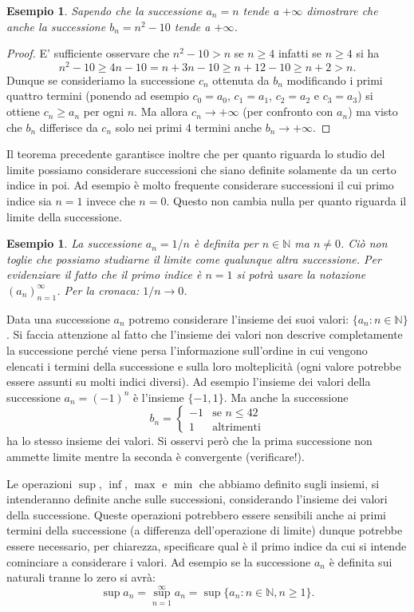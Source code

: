 \documentclass[italian,a4paper,oneside,headinclude]{scrbook}
\newcommand{\NN}{\mathbb N}
\newtheorem{example}[theorem]{Esempio}
\begin{document}
\begin{example}
Sapendo che la successione $a_n = n$ tende a $+\infty$ dimostrare
che anche la successione $b_n = n^2-10$ tende a $+\infty$.
\end{example}
%
\begin{proof}
E' sufficiente osservare che $n^2-10 > n$ se $n\ge 4$ infatti
se $n\ge 4$ si ha
\[
n^2 - 10 \ge 4 n -10 = n + 3n - 10 \ge n + 12 -10 \ge n+2 > n.
\]
Dunque se consideriamo la successione $c_n$ ottenuta da $b_n$
modificando i primi quattro termini (ponendo ad esempio $c_0 = a_0$,
$c_1=a_1$, $c_2=a_2$ e $c_3=a_3$) si ottiene $c_n\ge a_n$ per ogni $n$.
Ma allora $c_n \to +\infty$ (per confronto con $a_n$) ma visto che
$b_n$ differisce da $c_n$ solo nei primi 4 termini anche $b_n\to +\infty$.
\end{proof}

Il teorema precedente garantisce inoltre
che per quanto riguarda lo studio del limite possiamo considerare
successioni che siano definite solamente da un certo indice in poi.
Ad esempio è molto frequente considerare successioni il cui primo indice sia
$n=1$ invece che $n=0$. Questo non cambia nulla per quanto riguarda il limite
della successione.

\begin{example}
La successione $a_n = 1/n$ è definita per $n\in \NN$ ma $n\neq 0$.
Ciò non toglie che possiamo studiarne il limite come qualunque altra
successione. Per evidenziare il fatto che il primo indice è $n=1$
si potrà usare la notazione $(a_n)_{n=1}^\infty$.
Per la cronaca: $1/n \to 0$.
\end{example}

Data una successione $a_n$ potremo considerare l'insieme
dei suoi valori: $\{a_n\colon n\in \NN\}$.
Si faccia attenzione al fatto che l'insieme dei valori
non descrive completamente la successione perché
viene persa l'informazione sull'ordine in cui vengono elencati
i termini della successione e sulla loro molteplicità (ogni valore
potrebbe essere assunti su molti indici diversi). Ad esempio
l'insieme dei valori della successione $a_n = (-1)^n$ è l'insieme $\{-1, 1\}$. Ma anche la successione
\[
 b_n = \begin{cases}
   -1 & \text{se $n\le 42$}\\
   1  & \text{altrimenti}
 \end{cases}
\]
ha lo stesso insieme dei valori. Si osservi però
che la prima successione non ammette limite mentre la seconda
è convergente (verificare!).

Le operazioni $\sup$, $\inf$, $\max$ e $\min$ che abbiamo
definito sugli insiemi, si intenderanno definite anche
sulle successioni, considerando l'insieme dei valori della successione.
Queste operazioni potrebbero essere sensibili anche ai primi termini della
successione (a differenza dell'operazione di limite) dunque potrebbe
essere necessario, per chiarezza, specificare qual è il primo indice
da cui si intende cominciare a considerare i valori. Ad esempio
se la successione $a_n$ è definita sui naturali tranne lo zero
si avrà:
\[
  \sup a_n = \sup_{n=1}^\infty a_n = \sup\{a_n \colon n \in \NN, n \ge 1\}.
\]
\end{document}
